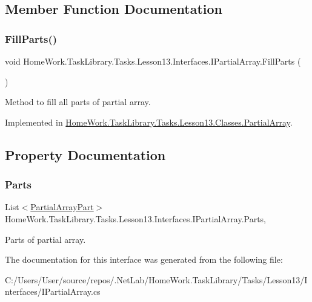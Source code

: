 \subsection{Member Function Documentation}
\mbox{\label{interface_home_work_1_1_task_library_1_1_tasks_1_1_lesson13_1_1_interfaces_1_1_i_partial_array_a8b4b7d6323832908c7c5af53904a9697}} 
\subsubsection{\texorpdfstring{FillParts()}{FillParts()}}
{\footnotesize\ttfamily void Home\+Work.\+Task\+Library.\+Tasks.\+Lesson13.\+Interfaces.\+I\+Partial\+Array.\+Fill\+Parts (\begin{DoxyParamCaption}{ }\end{DoxyParamCaption})}



Method to fill all parts of partial array. 



Implemented in \mbox{\hyperlink{class_home_work_1_1_task_library_1_1_tasks_1_1_lesson13_1_1_classes_1_1_partial_array_a87d2c4381a229c73895d4ea5540d1854}{Home\+Work.\+Task\+Library.\+Tasks.\+Lesson13.\+Classes.\+Partial\+Array}}.



\subsection{Property Documentation}
\mbox{\label{interface_home_work_1_1_task_library_1_1_tasks_1_1_lesson13_1_1_interfaces_1_1_i_partial_array_a85ea6fbfe8c945007979b41ab35a71d9}} 
\subsubsection{\texorpdfstring{Parts}{Parts}}
{\footnotesize\ttfamily List$<$\mbox{\hyperlink{class_home_work_1_1_task_library_1_1_tasks_1_1_lesson13_1_1_classes_1_1_partial_array_part}{Partial\+Array\+Part}}$>$ Home\+Work.\+Task\+Library.\+Tasks.\+Lesson13.\+Interfaces.\+I\+Partial\+Array.\+Parts\hspace{0.3cm}{\ttfamily [get]}, {\ttfamily [set]}}



Parts of partial array. 



The documentation for this interface was generated from the following file\+:\begin{DoxyCompactItemize}
\item 
C\+:/\+Users/\+User/source/repos/.\+Net\+Lab/\+Home\+Work.\+Task\+Library/\+Tasks/\+Lesson13/\+Interfaces/I\+Partial\+Array.\+cs\end{DoxyCompactItemize}
